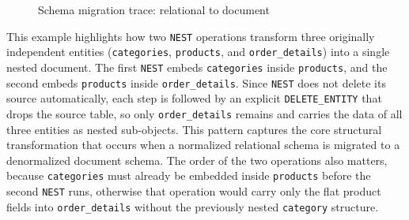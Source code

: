\begin{figure}[htbp!]
{%
    }
    \caption{Schema migration trace: relational to document}
    \label{fig:transformation-trace}
  \end{figure}

This example highlights how two \texttt{NEST} operations transform three originally independent entities
  (\texttt{categories}, \texttt{products}, and \texttt{order\_details}) into a single nested document.
  The first \texttt{NEST} embeds \texttt{categories} inside \texttt{products}, and the second embeds
  \texttt{products} inside \texttt{order\_details}. Since \texttt{NEST} does not delete its source
  automatically, each step is followed by an explicit \texttt{DELETE\_ENTITY} that drops the source
  table, so only \texttt{order\_details} remains and carries the data of all three entities as nested
  sub-objects. This pattern captures the core structural transformation that occurs when a normalized
  relational schema is migrated to a denormalized document schema. The order of the two operations also
  matters, because \texttt{categories} must already be embedded inside \texttt{products} before the
  second \texttt{NEST} runs, otherwise that operation would carry only the flat product fields into
  \texttt{order\_details} without the previously nested \texttt{category} structure.


